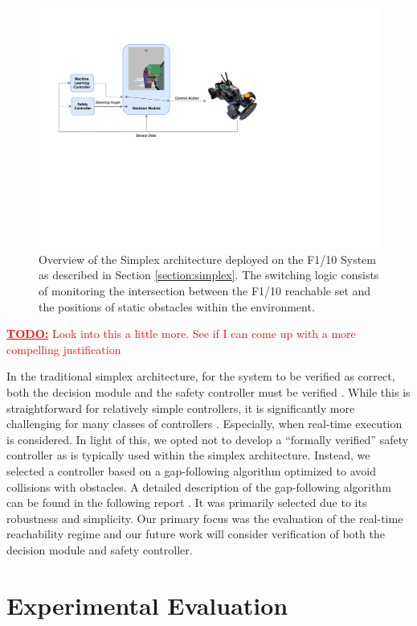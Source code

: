 \documentclass[manuscript,screen,review]{acmart}
\newcommand{\todo}[1]{\textcolor{red}{\textbf{\underline{TODO:}} #1}}
\begin{document}
\begin{figure}[htbp]%
  \centering
  \includegraphics[width=0.7\linewidth]{figures/simplex_simple_v2.pdf}
  \caption{Overview of the Simplex architecture deployed on the F1/10 System as described in Section \ref{section:simplex}. The switching logic consists of monitoring the intersection between the F1/10 reachable set and the positions of static obstacles within the environment.}
  \label{fig:simplex_arch}
\end{figure}%

\todo{Look into this a little more. See if I can come up with a more compelling justification }

In the traditional simplex architecture, for the system to be verified as correct, both the decision module and the safety controller must be verified \cite{Mehmood2021}. While this is straightforward for relatively simple controllers, it is significantly more challenging for many classes of controllers \cite{ivanov2020case}. Especially, when real-time execution is considered. In light of this, we opted not to develop a ``formally verified'' safety controller as is typically used within the simplex architecture. Instead, we selected a controller based on a gap-following algorithm optimized to avoid collisions with obstacles. A detailed description of the gap-following algorithm can be found in the following report \cite{otterness_2019}. It was primarily selected due to its robustness and simplicity.  Our primary focus was the evaluation of the real-time reachability regime and our future work will consider verification of both the decision module and safety controller. 


\section{Experimental Evaluation}
\end{document}
